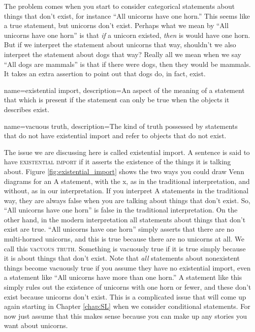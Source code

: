 The problem comes when you start to consider categorical statements about things that don't exist, for instance ``All unicorns have one horn.'' This seems like a true statement, but unicorns don't exist. Perhaps what we mean by ``All unicorns have one horn'' is that \emph{if} a unicorn existed, \emph{then} is would have one horn. But if we interpret the statement about unicorns that way, shouldn't we also interpret the statement about dogs that way? Really all we mean when we say ``All dogs are mammals'' is that if there were dogs, then they would be mammals. It takes an extra assertion to point out that dogs do, in fact, exist. 

{
name=existential import,
description={An aspect of the meaning of a statement that which is present if the statement can only be true when the objects it describes exist.}
}

{
name=vacuous truth,
description={The kind of truth possessed by statements that do not have existential import and refer to objects that do not exist.}
}

The issue we are discussing here is called existential import. A sentence is said to have \textsc{\gls{existential import}} \label{def:Existential_import} if it asserts the existence of the things it is talking about. Figure \ref{fig:existential_import} shows the two ways you could draw Venn diagrams for an A statement, with the x, as in the traditional interpretation, and without, as in our interpretation. If you interpret A statements in the traditional way, they are always false when you are talking about things that don't exist. So, ``All unicorns have one horn'' is false in the traditional interpretation. On the other hand, in the modern interpretation all statements about things that don't exist are true. ``All unicorns have one horn'' simply asserts that there are no multi-horned unicorns, and this is true because there are no unicorns at all. We call this \textsc{\gls{vacuous truth}}. Something is vacuously true \label{def:Vacuous_truth} if it is true simply because it is about things that don't exist. Note that \emph{all} statements about nonexistent things become vacuously true if you assume they have no existential import, even a statement like ``All unicorns have more than one horn.'' A statement like this simply rules out the existence of unicorns with one horn or fewer, and these don't exist because unicorns don't exist. This is a complicated issue that will come up again starting in Chapter \ref{chap:SL} when we consider conditional statements. For now just assume that this makes sense because you can make up any stories you want about unicorns. 

